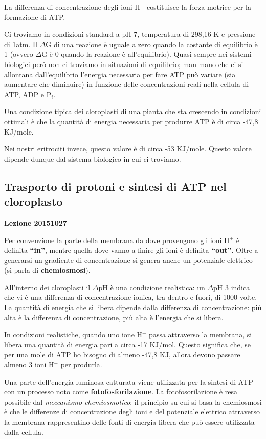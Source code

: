 \documentclass[]{article}
\begin{document}
La differenza di concentrazione degli ioni H$^+$ costituisce la forza
motrice per la formazione di ATP.

Ci troviamo in condizioni standard a pH 7, temperatura di 298,16 K e
pressione di 1atm. Il $\Delta$G di una reazione è uguale a zero quando
la costante di equilibrio è 1 (ovvero $\Delta$G è 0 quando la reazione è
all'equilibrio). Quasi sempre nei sistemi biologici però non ci troviamo
in situazioni di equilibrio; man mano che ci si allontana
dall'equilibrio l'energia necessaria per fare ATP può variare (sia
aumentare che diminuire) in funzione delle concentrazioni reali nella
cellula di ATP, ADP e P$_i$.

Una condizione tipica dei cloroplasti di una pianta che sta crescendo in
condizioni ottimali è che la quantità di energia necessaria per produrre
ATP è di circa -47,8 KJ/mole.

Nei nostri eritrociti invece, questo valore è di circa -53 KJ/mole.
Questo valore dipende dunque dal sistema biologico in cui ci troviamo.

\subsection{Trasporto di protoni e sintesi di ATP nel
cloroplasto}\label{trasporto-di-protoni-e-sintesi-di-atp-nel-cloroplasto}

\textbf{Lezione 20151027}

Per convenzione la parte della membrana da dove provengono gli ioni
H$^+$ è definita \textbf{``in''}, mentre quella dove vanno a finire gli
ioni è definita \textbf{``out''}. Oltre a generarsi un gradiente di
concentrazione si genera anche un potenziale elettrico (si parla di
\textbf{chemiosmosi}).

All'interno dei cloroplasti il $\Delta$pH è una condizione realistica:
un $\Delta$pH 3 indica che vi è una differenza di concentrazione ionica,
tra dentro e fuori, di 1000 volte. La quantità di energia che si libera
dipende dalla differenza di concentrazione: più alta è la differenza di
concentrazione, più alta è l'energia che si libera.

In condizioni realistiche, quando uno ione H$^+$ passa attraverso la
membrana, si libera una quantità di energia pari a circa -17 KJ/mol.
Questo significa che, se per una mole di ATP ho bisogno di almeno -47,8
KJ, allora devono passare almeno 3 ioni H$^+$ per produrla.

Una parte dell'energia luminosa catturata viene utilizzata per la
sintesi di ATP con un processo noto come \textbf{fotofosforilazione}. La
fotofosorilazione è resa possibile dal \emph{meccanismo chemiosmotico};
il principio su cui si basa la chemiosmosi è che le differenze di
concentrazione degli ioni e del potenziale elettrico attraverso la
membrana rappresentino delle fonti di energia libera che può essere
utilizzata dalla cellula.
\end{document}
